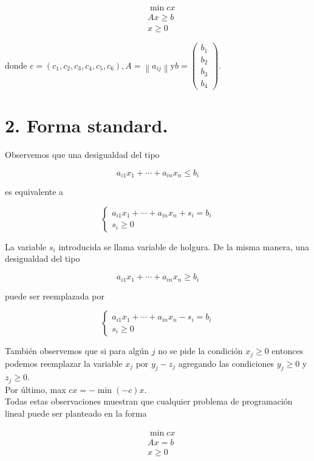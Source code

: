 \documentclass[10pt]{article}
\begin{document}
$$
\begin{aligned}
& \min c x \\
& A x \geq b \\
& x \geq 0
\end{aligned}
$$

donde $c=\left(c_{1}, c_{2}, c_{3}, c_{4}, c_{5}, c_{6}\right), A=\left\|a_{i j}\right\| \mathrm{y} b=\left(\begin{array}{l}b_{1} \\ b_{2} \\ b_{3} \\ b_{4}\end{array}\right)$.

\section*{2. Forma standard.}
Observemos que una desigualdad del tipo

$$
a_{i 1} x_{1}+\cdots+a_{i n} x_{n} \leq b_{i}
$$

es equivalente a

$$
\left\{\begin{array}{l}
a_{i 1} x_{1}+\cdots+a_{i n} x_{n}+s_{i}=b_{i} \\
s_{i} \geq 0
\end{array}\right.
$$

La variable $s_{i}$ introducida se llama variable de holgura. De la misma manera, una desigualdad del tipo

$$
a_{i 1} x_{1}+\cdots+a_{i n} x_{n} \geq b_{i}
$$

puede ser reemplazada por

$$
\left\{\begin{array}{l}
a_{i 1} x_{1}+\cdots+a_{i n} x_{n}-s_{i}=b_{i} \\
s_{i} \geq 0
\end{array}\right.
$$

También observemos que si para algún $j$ no se pide la condición $x_{j} \geq 0$ entonces podemos reemplazar la variable $x_{j}$ por $y_{j}-z_{j}$ agregando las condiciones $y_{j} \geq 0$ y $z_{j} \geq 0$.\\
Por último, max $c x=-\min (-c) x$.\\
Todas estas observaciones muestran que cualquier problema de programación lineal puede ser planteado en la forma

$$
\begin{aligned}
& \min c x \\
& A x=b \\
& x \geq 0
\end{aligned}
$$
\end{document}
